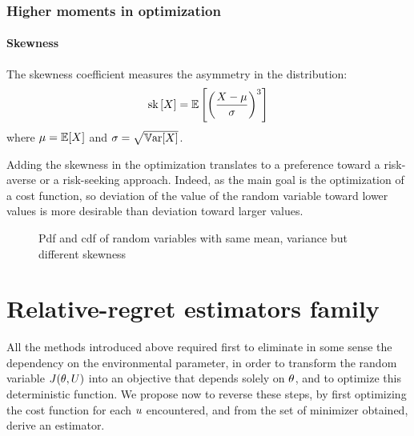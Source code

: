 \documentclass[../../Main_ManuscritThese.tex]{subfiles}
\newcommand\imgpath{/home/victor/acadwriting/Manuscrit/Text/Chapter3/img/}
\begin{document}
\subsubsection{Higher moments in optimization}

\paragraph{Skewness}
The skewness coefficient measures the asymmetry in the distribution:
\begin{equation}
  \mathrm{sk}\left[X\right] = \mathbb{E}\left[\left(\frac{X - \mu}{\sigma}\right)^3\right]
\end{equation}
where $\mu = \mathbb{E}[X]$ and $\sigma = \sqrt{\mathbb{V}\mathrm{ar}[X]}$.

Adding the skewness in the optimization translates to a preference toward a risk-averse or a risk-seeking approach. Indeed, as the main goal is the optimization of a cost function, so deviation of the value of the random variable toward lower values is more desirable than deviation toward larger values.

\begin{figure}[ht]
  \centering
  
  \caption{\label{fig:skewness_example} Pdf and cdf of random variables with same mean, variance but different skewness}
\end{figure}

\section{Relative-regret estimators family}
\label{sec:rr_family}
All the methods introduced above required first to eliminate in some sense the dependency on the environmental parameter, in order to transform the random variable $J(\theta, U)$ into an objective that depends solely on $\theta$, and to optimize this deterministic function.
We propose now to reverse these steps, by first optimizing the cost function for each $u$ encountered, and from the set of minimizer obtained, derive an estimator.
\end{document}
